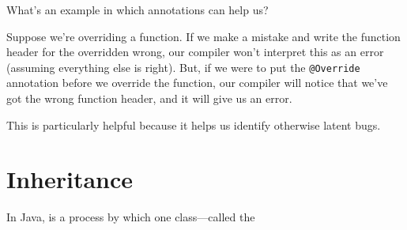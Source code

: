What's an example in which annotations can help us?

Suppose we're overriding a function. If we make a mistake and write the function header for the overridden wrong, our compiler won't interpret this as an error (assuming everything else is right). But, if we were to put the \verb!@Override! annotation before we override the function, our compiler will notice that we've got the wrong function header, and it will give us an error. 

This is particularly helpful because it helps us identify otherwise latent bugs.

\section{Inheritance}
In Java,  is a process by which one class---called the 